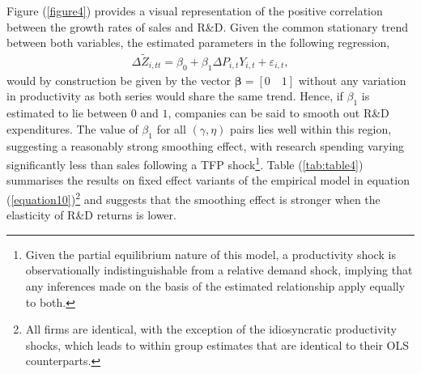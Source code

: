 \documentclass{_latex/house}
\begin{document}
Figure (\ref{figure4}) provides a visual representation of the positive correlation between the growth rates of sales and R\&D. Given the common stationary trend between both variables, the estimated parameters in the following regression,
\begin{align}
\Delta \tilde{Z}_{i,tt}=\beta_{0}+\beta_{1} \Delta P_{i,t}Y_{i,t}+\varepsilon_{i,t} \label{equation10},
\end{align}
would by construction be given by the vector $\boldsymbol{\beta}=[0\quad 1]$ without any variation in productivity as both series would share the same trend. Hence, if $\beta_{1}$ is estimated to lie between $0$ and $1$, companies can be said to smooth out R\&D expenditures. The value of $\beta_{1}$ for all $(\gamma,\eta)$ pairs lies well within this region, suggesting a reasonably strong smoothing effect, with research spending varying significantly less than sales following a TFP shock\footnote{Given the partial equilibrium nature of this model, a productivity shock is observationally indistinguishable from a relative demand shock, implying that any inferences made on the basis of the estimated relationship apply equally to both.}. Table (\ref{tab:table4}) summarises the results on fixed effect variants of the empirical model in equation (\ref{equation10})\footnote{All firms are identical, with the exception of the idiosyncratic productivity shocks, which leads to within group estimates that are identical to their OLS counterparts.} and suggests that the smoothing effect is stronger when the elasticity of R\&D returns is lower.
\end{document}
